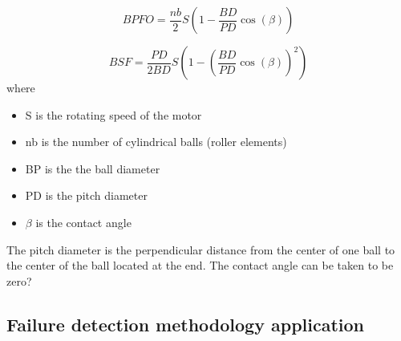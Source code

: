 \documentclass[../Main/thesis.tex]{subfiles}
\begin{document}
\begin{equation}\label{eq:bpfo}
BPFO = \frac{nb}{2}S\left( 1 -  \frac{BD}{PD}\cos(\beta)  \right)
\end{equation}

\begin{equation}\label{eq:bpfi}
BSF = \frac{PD}{2BD}S\left( 1 -  \left(\frac{BD}{PD}\cos(\beta)\right)^{2}  \right)
\end{equation}
\clearpage
where 
\begin{itemize}
\item S is the rotating speed of the motor
\item nb is the number of cylindrical balls (roller elements)
\item BP is the the ball diameter
\item PD is the pitch diameter
\item $\beta$ is the contact angle
\end{itemize}
The pitch diameter is the perpendicular distance from the center of one ball to the center of the ball located at the end. The contact angle can be taken to be zero?


\subsection{Failure detection methodology application}
\label{sec:method}
\end{document}
